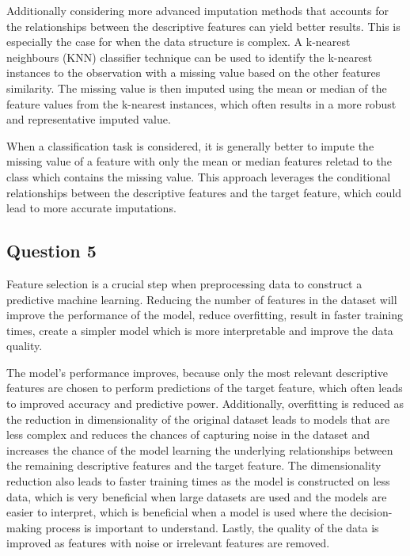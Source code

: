 \documentclass[10pt]{article}
\begin{document}
Additionally considering more advanced imputation methods that accounts for the relationships between
the descriptive features can yield better results. This is especially the case for when the data structure is complex.
A k-nearest neighbours (KNN) classifier technique can be used to identify the k-nearest instances to the observation with a
missing value based on the other features similarity.
The missing value is then imputed using the mean or median of the feature values from the k-nearest instances, which often results
in a more robust and representative imputed value.

When a classification task is considered, it is generally better to impute the missing value of a feature with only the mean
or median features reletad to the class which contains the missing value. This approach leverages the conditional relationships
between the descriptive features and the target feature, which could lead to more accurate imputations.

\subsection*{Question 5}

Feature selection is a crucial step when preprocessing data to construct a predictive machine learning.
Reducing the number of features in the dataset will improve the performance of the model, reduce overfitting,
result in faster training times, create a simpler model which is more interpretable and improve the data quality.

The model's performance improves, because only the most relevant descriptive features are chosen to perform predictions of
the target feature, which often leads to improved accuracy and predictive power. Additionally, overfitting is reduced as the
reduction in dimensionality of the original dataset leads to models that are less complex and reduces the chances of capturing noise
in the dataset and increases the chance of the model learning the underlying relationships between the remaining descriptive features
and the target feature. The dimensionality reduction also leads to faster training times as the model is constructed on less data, which
is very beneficial when large datasets are used and the models are easier to interpret, which is beneficial when a model is used where
the decision-making process is important to understand. Lastly, the quality of the data is improved as features with noise or irrelevant
features are removed. 
\end{document}
